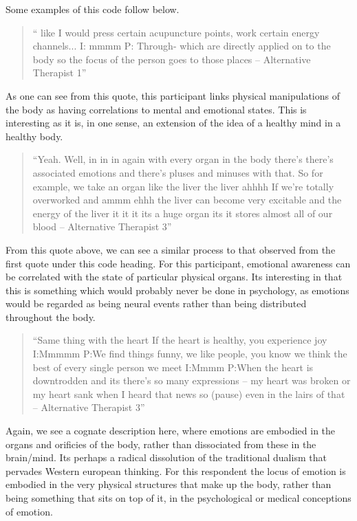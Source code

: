 Some examples of this code follow below. 

\begin{quotation}
`` like I would press certain acupuncture points, work certain energy channels...
I: mmmm
P: Through- which are directly applied on to the body so the focus of the person goes to those places – Alternative Therapist 1''  
\end{quotation}


As one can see from this quote, this participant links physical manipulations of the body as having correlations to mental and emotional states. This is interesting as it is, in one sense, an extension of the idea of a healthy mind in a healthy body. 


\begin{quotation}
``Yeah. Well, in in in again with every organ in the body there's there's associated emotions and there's pluses and minuses with that. So for example, we take an organ like the liver the liver ahhhh If we're totally overworked and ammm ehhh the liver can become very excitable and the energy of the liver it it it its a huge organ its it stores almost all of our blood – Alternative Therapist 3''  
\end{quotation}


From this quote above, we can see a similar process to that observed from the first quote under this code heading. For this participant, emotional awareness can be correlated with the state of particular physical organs. Its interesting in that this is something which would probably never be done in psychology, as emotions would be regarded as being neural events rather than being distributed throughout the body. 

\begin{quotation}
``Same thing with the heart If the heart is healthy, you experience joy 
I:Mmmmm
P:We find things funny, we like people, you know we think the best of every single person we meet 
I:Mmmm
P:When the heart is downtrodden and its there's so many expressions – my heart was broken or my heart sank when I heard that news so (pause) even in the lairs of that – Alternative Therapist 3''  
\end{quotation}


Again, we see a cognate description here, where emotions are embodied in the organs and orificies of the body, rather than dissociated from these in the brain/mind. Its perhaps a radical dissolution of the traditional dualism that pervades Western european thinking. For this respondent the locus of emotion is embodied in the very physical structures that make up the body, rather than being something that sits on top of it, in the psychological or medical conceptions of emotion. 

